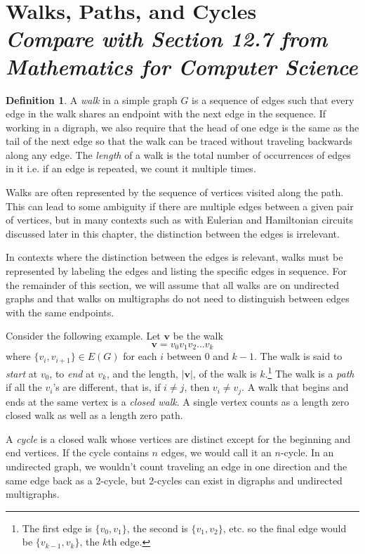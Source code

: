 \documentclass[11pt,oneside]{book}
\theoremstyle{definition}
\newtheorem{defn}[thm]{Definition}
\begin{document}
\section[Walks, Paths, and Cycles]{Walks, Paths, and Cycles\\[0.5ex]
\normalsize\normalfont\textit{
    Compare with Section 12.7 from \emph{Mathematics for Computer Science}
}}
\begin{defn}
  A \emph{walk} in a simple graph $G$ is a sequence of edges such that every edge in the walk shares an endpoint with the next edge in the sequence.
  If working in a digraph, we also require that the head of one edge is the same as the tail of the next edge so that the walk can be traced without traveling backwards along any edge.
  The \emph{length} of a walk is the total number of occurrences of edges in it i.e. if an edge is repeated, we count it multiple times.
\end{defn}
Walks are often represented by the sequence of vertices visited along the path.
This can lead to some ambiguity if there are multiple edges between a given pair of vertices, but in many contexts such as with Eulerian and Hamiltonian circuits discussed later in this chapter, the distinction between the edges is irrelevant.

In contexts where the distinction between the edges is relevant, walks must be represented by labeling the edges and listing the specific edges in sequence.
For the remainder of this section, we will assume that all walks are on undirected graphs and that walks on multigraphs do not need to distinguish between edges with the same endpoints.

Consider the following example.
Let $\mathbf{v}$ be the walk
\[ \mathbf{v} = v_{0}v_{1}v_{2} \dots v_{k} \]
where $\{ v_{i}, v_{i + 1} \} \in E(G)$ for each $i$ between $0$ and $k - 1$.
The walk is said to \emph{start} at $v_{0}$, to \emph{end}
at $v_{k}$, and the length, $|\mathbf{v}|$, of the walk is $k$.\footnote{
  The first edge is $\{ v_{0}, v_{1} \}$, the second is $\{ v_{1}, v_{2} \}$, etc. so the final edge would be $\{ v_{k - 1}, v_{k} \}$, the $k$th edge.
}
The walk is a \emph{path} if all the $v_{i}$'s are different, that is, if $i \neq j$, then $v_{i} \neq v_{j}$.
A walk that begins and ends at the same vertex is a \emph{closed walk}.
A single vertex counts as a length zero closed walk as well as a length zero path.

A \emph{cycle} is a closed walk whose vertices are distinct except for the beginning and end vertices.
If the cycle contains $n$ edges, we would call it an $n$-cycle.
In an undirected graph, we wouldn't count traveling an edge in one direction and the same edge back as a 2-cycle, but 2-cycles can exist in digraphs and undirected multigraphs.
\end{document}
